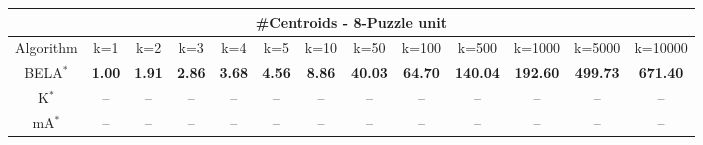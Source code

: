 \begin{tabular}{c|cccccccccccc}\toprule
\multicolumn{13}{c}{#Centroids - 8-Puzzle unit}\\ \midrule
Algorithm & k=1 & k=2 & k=3 & k=4 & k=5 & k=10 & k=50 & k=100 & k=500 & k=1000 & k=5000 & k=10000 \\ \midrule
BELA$^*$ & \textbf{1.00} & \textbf{1.91} & \textbf{2.86} & \textbf{3.68} & \textbf{4.56} & \textbf{8.86} & \textbf{40.03} & \textbf{64.70} & \textbf{140.04} & \textbf{192.60} & \textbf{499.73} & \textbf{671.40} \\
K$^*$ & -- & -- & -- & -- & -- & -- & -- & -- & -- & -- & -- & -- \\
mA$^*$ & -- & -- & -- & -- & -- & -- & -- & -- & -- & -- & -- & -- \\ \bottomrule 
\end{tabular}

